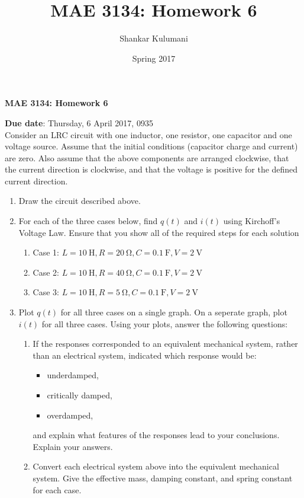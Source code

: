 \documentclass[11pt, reqno]{article}    %
\title{MAE 3134: Homework 6}
\author{Shankar Kulumani}
\date{Spring 2017}                          %
\begin{document}
{\noindent\Large \textbf{MAE 3134: Homework 6}}

\noindent \textbf{Due date}: Thursday, 6 April 2017, 0935 \\


Consider an LRC circuit with one inductor, one resistor, one capacitor and one voltage source.
Assume that the initial conditions (capacitor charge and current) are zero.
Also assume that the above components are arranged clockwise, that the current direction is clockwise, and that the voltage is positive for the defined current direction.

\begin{enumerate}
    \item Draw the circuit described above.
    \item For each of the three cases below, find \( q(t) \) and \( i(t)\) using Kirchoff's Voltage Law. 
    Ensure that you show all of the required steps for each solution
    \begin{enumerate}
        \item Case 1: \( L = \SI{10}{\henry}, R = \SI{20}{\ohm}, C = \SI{0.1}{\farad}, V = \SI{2}{\volt}\)
        \item Case 2: \( L = \SI{10}{\henry}, R = \SI{40}{\ohm}, C = \SI{0.1}{\farad}, V = \SI{2}{\volt}\)
        \item Case 3: \( L = \SI{10}{\henry}, R = \SI{5}{\ohm}, C = \SI{0.1}{\farad}, V = \SI{2}{\volt}\)
    \end{enumerate}
    \item Plot \( q(t) \) for all three cases on a single graph. 
    On a seperate graph, plot \( i(t) \) for all three cases.
    Using your plots, answer the following questions:
    \begin{enumerate}
        \item If the responses corresponded to an equivalent mechanical system, rather than an electrical system, indicated which response would be:
        \begin{itemize}
            \item underdamped,
            \item critically damped,
            \item overdamped,
        \end{itemize}
        and explain what features of the responses lead to your conclusions. 
        Explain your answers.
        \item Convert each electrical system above into the equivalent mechanical system. 
        Give the effective mass, damping constant, and spring constant for each case. 

\end{enumerate}
\end{enumerate}
\end{document}
